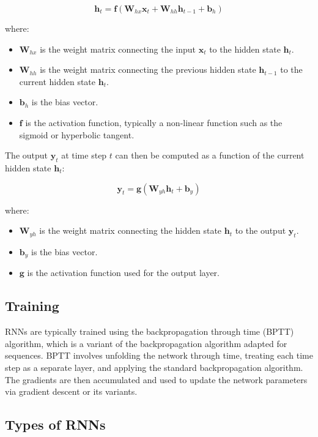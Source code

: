 \documentclass[a4paper]{report}
\begin{document}
{\[
\mathbf{h}_t = \mathbf{f}(\mathbf{W}_{hx} \mathbf{x}_t + \mathbf{W}_{hh} \mathbf{h}_{t-1} + \mathbf{b}_h)
\]

where:
\begin{itemize}
    \item \( \mathbf{W}_{hx} \) is the weight matrix connecting the input \( \mathbf{x}_t \) to the hidden state \( \mathbf{h}_t \).
    \item \( \mathbf{W}_{hh} \) is the weight matrix connecting the previous hidden state \( \mathbf{h}_{t-1} \) to the current hidden state \( \mathbf{h}_t \).
    \item \( \mathbf{b}_h \) is the bias vector.
    \item \( \mathbf{f} \) is the activation function, typically a non-linear function such as the sigmoid or hyperbolic tangent.
\end{itemize}

The output \( \mathbf{y}_t \) at time step \( t \) can then be computed as a function of the current hidden state \( \mathbf{h}_t \):

\[
\mathbf{y}_t = \mathbf{g}(\mathbf{W}_{yh} \mathbf{h}_t + \mathbf{b}_y)
\]

where:
\begin{itemize}
    \item \( \mathbf{W}_{yh} \) is the weight matrix connecting the hidden state \( \mathbf{h}_t \) to the output \( \mathbf{y}_t \).
    \item \( \mathbf{b}_y \) is the bias vector.
    \item \( \mathbf{g} \) is the activation function used for the output layer.
\end{itemize}

\subsection{Training}

RNNs are typically trained using the backpropagation through time (BPTT) algorithm, which is a variant of the backpropagation algorithm adapted for sequences. BPTT involves unfolding the network through time, treating each time step as a separate layer, and applying the standard backpropagation algorithm. The gradients are then accumulated and used to update the network parameters via gradient descent or its variants.

\subsection{Types of RNNs}

}
\end{document}
